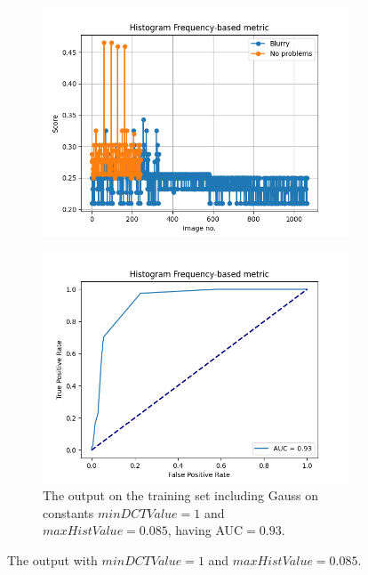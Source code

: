 \begin{figure}[H]
\begin{subfigure}[t]{0.48\textwidth}
        \label{fig:HF_roc_85}
    \end{subfigure}\hspace{1em}
    \begin{subfigure}[t]{0.48\textwidth}
        \includegraphics[width=\textwidth]{Figures/tweakHF/min1_max0.085_output_basic.png}
        \caption{}
        \label{fig:HF_basic_gauss_85}
    \end{subfigure}\hspace{1em}
    \begin{subfigure}[t]{0.48\textwidth}
        \includegraphics[width=\textwidth]{Figures/tweakHF/min1_max0.085_output_roc.png}
        \caption{The output on the training set including Gauss on constants $minDCTValue=1$ and $maxHistValue=0.085$, having AUC$=0.93$.}
        \label{fig:HF_roc_gauss_85}
    \end{subfigure}
    \caption{The output with $minDCTValue=1$ and $maxHistValue=0.085$.}
\end{figure}

